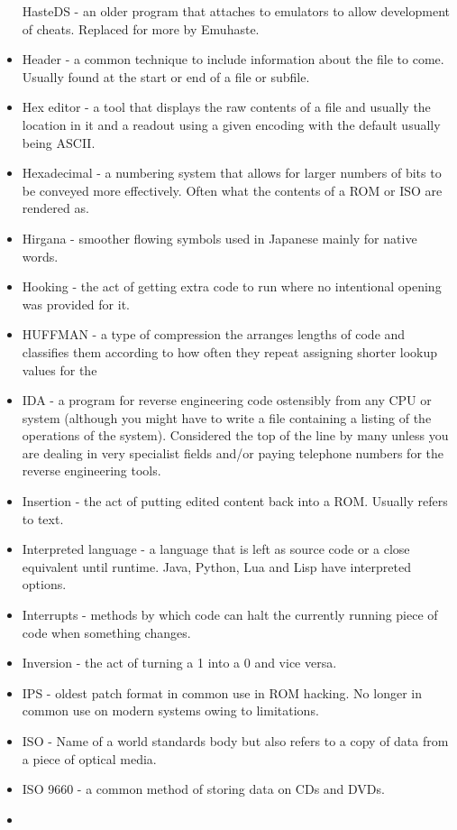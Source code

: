 \documentclass[
]{book}
\begin{document}
\begin{itemize}
  HasteDS - an older program that attaches to emulators to allow development of cheats. Replaced for more by Emuhaste.
\item
  Header - a common technique to include information about the file to come. Usually found at the start or end of a file or subfile.
\item
  Hex editor - a tool that displays the raw contents of a file and usually the location in it and a readout using a given encoding with the default usually being ASCII.
\item
  Hexadecimal - a numbering system that allows for larger numbers of bits to be conveyed more effectively. Often what the contents of a ROM or ISO are rendered as.
\item
  Hirgana - smoother flowing symbols used in Japanese mainly for native words.
\item
  Hooking - the act of getting extra code to run where no intentional opening was provided for it.
\item
  HUFFMAN - a type of compression the arranges lengths of code and classifies them according to how often they repeat assigning shorter lookup values for the
\item
  IDA - a program for reverse engineering code ostensibly from any CPU or system (although you might have to write a file containing a listing of the operations of the system). Considered the top of the line by many unless you are dealing in very specialist fields and/or paying telephone numbers for the reverse engineering tools.
\item
  Insertion - the act of putting edited content back into a ROM. Usually refers to text.
\item
  Interpreted language - a language that is left as source code or a close equivalent until runtime. Java, Python, Lua and Lisp have interpreted options.
\item
  Interrupts - methods by which code can halt the currently running piece of code when something changes.
\item
  Inversion - the act of turning a 1 into a 0 and vice versa.
\item
  IPS - oldest patch format in common use in ROM hacking. No longer in common use on modern systems owing to limitations.
\item
  ISO - Name of a world standards body but also refers to a copy of data from a piece of optical media.
\item
  ISO 9660 - a common method of storing data on CDs and DVDs.
\item

\end{itemize}
\end{document}
